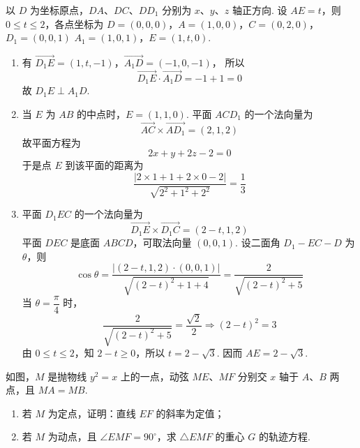 \begin{solution}
以 \(D\) 为坐标原点，\(DA\)、\(DC\)、\(DD_1\) 分别为 \(x\)、\(y\)、\(z\) 轴正方向. 设 \(AE=t\)，则 \(0\leqslant t\leqslant2\)，各点坐标为
\(D=(0,0,0)\)，\(A=(1,0,0)\)，\(C=(0,2,0)\)，\(D_1=(0,0,1)\)
\(A_1=(1,0,1)\)，\(E=(1,t,0)\).

\begin{enumerate}
\item 有
\(\overrightarrow{D_1E}=(1,t,-1)\)，\(\overrightarrow{A_1D}=(-1,0,-1)\)，
所以
\[
\overrightarrow{D_1E}\cdot\overrightarrow{A_1D}=-1+1=0
\]
故 \(D_1E\perp A_1D\).

\item 当 \(E\) 为 \(AB\) 的中点时，\(E=(1,1,0)\). 平面 \(ACD_1\) 的一个法向量为
\[
\overrightarrow{AC}\times\overrightarrow{AD_1}=(2,1,2)
\]
故平面方程为
\[
2x+y+2z-2=0
\]
于是点 \(E\) 到该平面的距离为
\[
\frac{|2\times1+1+2\times0-2|}{\sqrt{2^2+1^2+2^2}}=\frac13
\]

\item 平面 \(D_1EC\) 的一个法向量为
\[
\overrightarrow{D_1E}\times\overrightarrow{D_1C}=(2-t,1,2)
\]
平面 \(DEC\) 是底面 \(ABCD\)，可取法向量 \((0,0,1)\). 设二面角 \(D_1-EC-D\) 为 \(\theta\)，则
\[
\cos\theta=\frac{|(2-t,1,2)\cdot(0,0,1)|}{\sqrt{(2-t)^2+1+4}}=\frac2{\sqrt{(2-t)^2+5}}
\]
当 \(\theta=\dfrac\pi4\) 时，
\[
\frac2{\sqrt{(2-t)^2+5}}=\frac{\sqrt2}{2}
\Longrightarrow (2-t)^2=3
\]
由 \(0\leqslant t\leqslant2\)，知 \(2-t\geqslant0\)，所以 \(t=2-\sqrt3\). 因而 \(AE=2-\sqrt3\).
\end{enumerate}
\end{solution}

\begin{problem}
如图，\(M\) 是抛物线 \(y^2=x\) 上的一点，动弦 \(ME\)、\(MF\) 分别交 \(x\) 轴于 \(A\)、\(B\) 两点，且 \(MA=MB\).

\begin{enumerate}
\item 若 \(M\) 为定点，证明：直线 \(EF\) 的斜率为定值；
\item 若 \(M\) 为动点，且 \(\angle EMF=90^{\circ}\)，求 \(\triangle EMF\) 的重心 \(G\) 的轨迹方程.
\end{enumerate}

\end{problem}

\FloatBarrier


